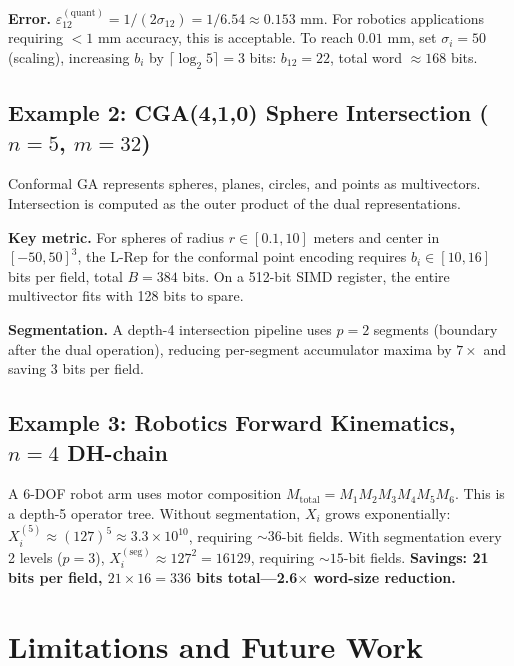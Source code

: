 \documentclass[11pt,a4paper]{article}
\theoremstyle{definition}
\theoremstyle{plain}
\theoremstyle{remark}
\begin{document}
\textbf{Error.}  $\varepsilon_{12}^{(\mathrm{quant})} = 1/(2\sigma_{12}) = 1/6.54 \approx 0.153$ mm.  For robotics applications requiring $< 1$ mm accuracy, this is acceptable.  To reach $0.01$ mm, set $\sigma_i = 50$ (scaling), increasing $b_i$ by $\lceil\log_2 5\rceil = 3$ bits: $b_{12} = 22$, total word $\approx 168$ bits.

\subsection{Example 2: CGA(4,1,0) Sphere Intersection ($n=5$, $m=32$)}

Conformal GA represents spheres, planes, circles, and points as multivectors.  Intersection is computed as the outer product of the dual representations.

\textbf{Key metric.}  For spheres of radius $r\in[0.1, 10]$ meters and center in $[-50,50]^3$, the L-Rep for the conformal point encoding requires $b_i\in[10,16]$ bits per field, total $B = 384$ bits.  On a 512-bit SIMD register, the entire multivector fits with 128 bits to spare.

\textbf{Segmentation.}  A depth-4 intersection pipeline uses $p=2$ segments (boundary after the dual operation), reducing per-segment accumulator maxima by $7\times$ and saving 3 bits per field.

\subsection{Example 3: Robotics Forward Kinematics, $n=4$ DH-chain}

A 6-DOF robot arm uses motor composition $M_\mathrm{total} = M_1 M_2 M_3 M_4 M_5 M_6$.  This is a depth-5 operator tree.  Without segmentation, $X_i$ grows exponentially: $X_i^{(5)} \approx (127)^5 \approx 3.3\times 10^{10}$, requiring $\sim 36$-bit fields.  With segmentation every 2 levels ($p=3$), $X_i^{(\text{seg})} \approx 127^2 = 16129$, requiring $\sim 15$-bit fields.  \textbf{Savings: 21 bits per field, $21\times 16 = 336$ bits total---2.6$\times$ word-size reduction.}

\section{Limitations and Future Work}
\label{sec:limitations}
\end{document}
